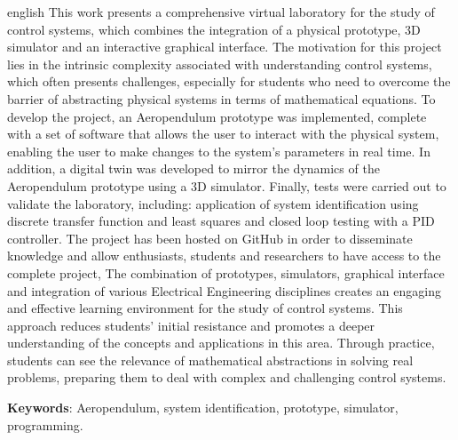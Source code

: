 \begin{resumo}[Abstract]
	
	\begin{otherlanguage*}{english}
	   This work presents a comprehensive virtual laboratory for the study of control systems, which combines the integration of a physical prototype, 3D simulator and an interactive graphical interface. The motivation for this project lies in the intrinsic complexity associated with understanding control systems, which often presents challenges, especially for students who need to overcome the barrier of abstracting physical systems in terms of mathematical equations. To develop the project, an Aeropendulum prototype was implemented, complete with a set of software that allows the user to interact with the physical system, enabling the user to make changes to the system's parameters in real time. In addition, a digital twin was developed to mirror the dynamics of the Aeropendulum prototype using a 3D simulator. Finally, tests were carried out to validate the laboratory, including: application of system identification using discrete transfer function and least squares and closed loop testing with a PID controller. The project has been hosted on GitHub in order to disseminate knowledge and allow enthusiasts, students and researchers to have access to the complete project, The combination of prototypes, simulators, graphical interface and integration of various Electrical Engineering disciplines creates an engaging and effective learning environment for the study of control systems. This approach reduces students' initial resistance and promotes a deeper understanding of the concepts and applications in this area. Through practice, students can see the relevance of mathematical abstractions in solving real problems, preparing them to deal with complex and challenging control systems.
		
		\vspace{\onelineskip}
		
		\noindent 
		\textbf{Keywords}:  Aeropendulum, system identification, prototype, simulator, programming.
	\end{otherlanguage*}

\end{resumo}

